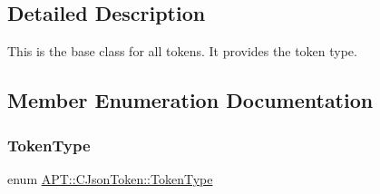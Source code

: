 \subsection{Detailed Description}
This is the base class for all tokens. It provides the token type. 

\subsection{Member Enumeration Documentation}
\mbox{\label{classAPT_1_1CJsonToken_aab8edca6cac7d6c2cd4cb37ea0ab0dce}} 
\subsubsection{\texorpdfstring{Token\+Type}{TokenType}}
{\footnotesize\ttfamily enum \hyperlink{classAPT_1_1CJsonToken_aab8edca6cac7d6c2cd4cb37ea0ab0dce}{A\+P\+T\+::\+C\+Json\+Token\+::\+Token\+Type}}

